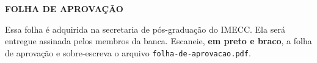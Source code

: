 \begin{center}
  {\Large \textbf{FOLHA DE APROVAÇÃO}
  }
\end{center}

Essa folha é adquirida na secretaria de pós-graduação do IMECC. Ela será
entregue assinada pelos membros da banca. Escaneie,
\textbf{em preto e braco},
a folha de aprovação e
sobre-escreva o arquivo \verb+folha-de-aprovacao.pdf+.
